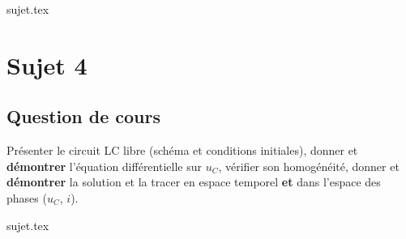 \documentclass[a4paper, 11pt]{book}
\begin{document}
{sujet.tex}

\resetQ
\newpage

\chapter{Sujet 4}
\section{Question de cours}

Présenter le circuit LC libre (schéma et conditions initiales), donner et
\textbf{démontrer} l'équation différentielle sur $u_C$, vérifier son
homogénéité, donner et \textbf{démontrer} la solution et la tracer en espace
temporel \textbf{et} dans l'espace des phases ($u_C$, $i$).

{sujet.tex}
\end{document}
